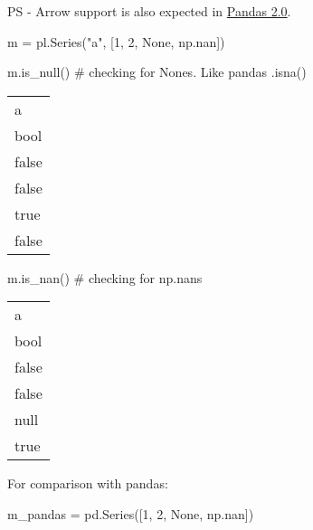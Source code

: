 \documentclass[
  letterpaper,
  DIV=11,
  numbers=noendperiod]{scrartcl}
\newenvironment{Shaded}{\begin{snugshade}}{\end{snugshade}}
\newcommand{\CommentTok}[1]{\textcolor[rgb]{0.37,0.37,0.37}{#1}}
\newcommand{\DecValTok}[1]{\textcolor[rgb]{0.68,0.00,0.00}{#1}}
\newcommand{\NormalTok}[1]{\textcolor[rgb]{0.00,0.23,0.31}{#1}}
\newcommand{\OperatorTok}[1]{\textcolor[rgb]{0.37,0.37,0.37}{#1}}
\newcommand{\StringTok}[1]{\textcolor[rgb]{0.13,0.47,0.30}{#1}}
\newcommand{\VariableTok}[1]{\textcolor[rgb]{0.07,0.07,0.07}{#1}}
\begin{document}
PS - Arrow support is also expected in
\href{https://datapythonista.me/blog/pandas-20-and-the-arrow-revolution-part-i}{Pandas
2.0}.

\begin{Shaded}
\begin{Highlighting}[]
\NormalTok{m }\OperatorTok{=}\NormalTok{ pl.Series(}\StringTok{"a"}\NormalTok{, [}\DecValTok{1}\NormalTok{, }\DecValTok{2}\NormalTok{, }\VariableTok{None}\NormalTok{, np.nan])}
\end{Highlighting}
\end{Shaded}

\begin{Shaded}
\begin{Highlighting}[]
\NormalTok{m.is\_null() }\CommentTok{\# checking for None\textquotesingle{}s. Like pandas .isna()}
\end{Highlighting}
\end{Shaded}

\begin{longtable}[]{@{}l@{}}
\toprule()
a \\
bool \\
\midrule()
\endhead
false \\
false \\
true \\
false \\
\bottomrule()
\end{longtable}

\begin{Shaded}
\begin{Highlighting}[]
\NormalTok{m.is\_nan() }\CommentTok{\# checking for np.nan\textquotesingle{}s}
\end{Highlighting}
\end{Shaded}

\begin{longtable}[]{@{}l@{}}
\toprule()
a \\
bool \\
\midrule()
\endhead
false \\
false \\
null \\
true \\
\bottomrule()
\end{longtable}

For comparison with pandas:

\begin{Shaded}
\begin{Highlighting}[]
\NormalTok{m\_pandas }\OperatorTok{=}\NormalTok{ pd.Series([}\DecValTok{1}\NormalTok{, }\DecValTok{2}\NormalTok{, }\VariableTok{None}\NormalTok{, np.nan])}
\end{Highlighting}
\end{Shaded}
\end{document}
